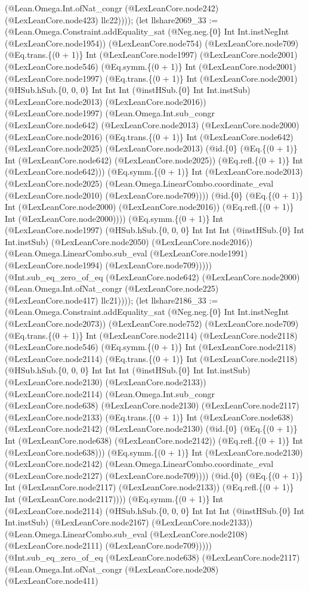 \documentclass[11pt]{article}
\begin{document}
(@Lean.Omega.Int.ofNat\_congr (@LexLeanCore.node242) (@LexLeanCore.node423) llc22)))); (let llshare2069\_33 := (@Lean.Omega.Constraint.addEquality\_sat (@Neg.neg.\{0\} Int Int.instNegInt (@LexLeanCore.node1954)) (@LexLeanCore.node754) (@LexLeanCore.node709) (@Eq.trans.\{(0 + 1)\} Int (@LexLeanCore.node1997) (@LexLeanCore.node2001) (@LexLeanCore.node546) (@Eq.symm.\{(0 + 1)\} Int (@LexLeanCore.node2001) (@LexLeanCore.node1997) (@Eq.trans.\{(0 + 1)\} Int (@LexLeanCore.node2001) (@HSub.hSub.\{0, 0, 0\} Int Int Int (@instHSub.\{0\} Int Int.instSub) (@LexLeanCore.node2013) (@LexLeanCore.node2016)) (@LexLeanCore.node1997) (@Lean.Omega.Int.sub\_congr (@LexLeanCore.node642) (@LexLeanCore.node2013) (@LexLeanCore.node2000) (@LexLeanCore.node2016) (@Eq.trans.\{(0 + 1)\} Int (@LexLeanCore.node642) (@LexLeanCore.node2025) (@LexLeanCore.node2013) (@id.\{0\} (@Eq.\{(0 + 1)\} Int (@LexLeanCore.node642) (@LexLeanCore.node2025)) (@Eq.refl.\{(0 + 1)\} Int (@LexLeanCore.node642))) (@Eq.symm.\{(0 + 1)\} Int (@LexLeanCore.node2013) (@LexLeanCore.node2025) (@Lean.Omega.LinearCombo.coordinate\_eval (@LexLeanCore.node2010) (@LexLeanCore.node709)))) (@id.\{0\} (@Eq.\{(0 + 1)\} Int (@LexLeanCore.node2000) (@LexLeanCore.node2016)) (@Eq.refl.\{(0 + 1)\} Int (@LexLeanCore.node2000)))) (@Eq.symm.\{(0 + 1)\} Int (@LexLeanCore.node1997) (@HSub.hSub.\{0, 0, 0\} Int Int Int (@instHSub.\{0\} Int Int.instSub) (@LexLeanCore.node2050) (@LexLeanCore.node2016)) (@Lean.Omega.LinearCombo.sub\_eval (@LexLeanCore.node1991) (@LexLeanCore.node1994) (@LexLeanCore.node709))))) (@Int.sub\_eq\_zero\_of\_eq (@LexLeanCore.node642) (@LexLeanCore.node2000) (@Lean.Omega.Int.ofNat\_congr (@LexLeanCore.node225) (@LexLeanCore.node417) llc21)))); (let llshare2186\_33 := (@Lean.Omega.Constraint.addEquality\_sat (@Neg.neg.\{0\} Int Int.instNegInt (@LexLeanCore.node2073)) (@LexLeanCore.node752) (@LexLeanCore.node709) (@Eq.trans.\{(0 + 1)\} Int (@LexLeanCore.node2114) (@LexLeanCore.node2118) (@LexLeanCore.node546) (@Eq.symm.\{(0 + 1)\} Int (@LexLeanCore.node2118) (@LexLeanCore.node2114) (@Eq.trans.\{(0 + 1)\} Int (@LexLeanCore.node2118) (@HSub.hSub.\{0, 0, 0\} Int Int Int (@instHSub.\{0\} Int Int.instSub) (@LexLeanCore.node2130) (@LexLeanCore.node2133)) (@LexLeanCore.node2114) (@Lean.Omega.Int.sub\_congr (@LexLeanCore.node638) (@LexLeanCore.node2130) (@LexLeanCore.node2117) (@LexLeanCore.node2133) (@Eq.trans.\{(0 + 1)\} Int (@LexLeanCore.node638) (@LexLeanCore.node2142) (@LexLeanCore.node2130) (@id.\{0\} (@Eq.\{(0 + 1)\} Int (@LexLeanCore.node638) (@LexLeanCore.node2142)) (@Eq.refl.\{(0 + 1)\} Int (@LexLeanCore.node638))) (@Eq.symm.\{(0 + 1)\} Int (@LexLeanCore.node2130) (@LexLeanCore.node2142) (@Lean.Omega.LinearCombo.coordinate\_eval (@LexLeanCore.node2127) (@LexLeanCore.node709)))) (@id.\{0\} (@Eq.\{(0 + 1)\} Int (@LexLeanCore.node2117) (@LexLeanCore.node2133)) (@Eq.refl.\{(0 + 1)\} Int (@LexLeanCore.node2117)))) (@Eq.symm.\{(0 + 1)\} Int (@LexLeanCore.node2114) (@HSub.hSub.\{0, 0, 0\} Int Int Int (@instHSub.\{0\} Int Int.instSub) (@LexLeanCore.node2167) (@LexLeanCore.node2133)) (@Lean.Omega.LinearCombo.sub\_eval (@LexLeanCore.node2108) (@LexLeanCore.node2111) (@LexLeanCore.node709))))) (@Int.sub\_eq\_zero\_of\_eq (@LexLeanCore.node638) (@LexLeanCore.node2117) (@Lean.Omega.Int.ofNat\_congr (@LexLeanCore.node208) (@LexLeanCore.node411) 
\end{document}
